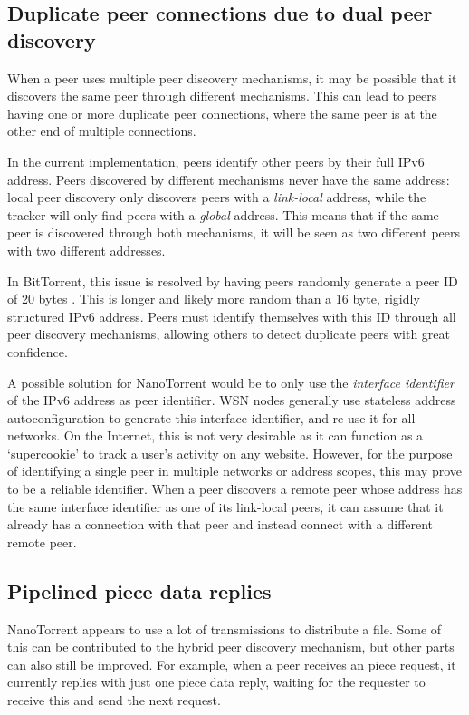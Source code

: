 \subsection{Duplicate peer connections due to dual peer discovery}
When a peer uses multiple peer discovery mechanisms, it may be possible that it discovers the same peer through different mechanisms. This can lead to peers having one or more duplicate peer connections, where the same peer is at the other end of multiple connections.

In the current implementation, peers identify other peers by their full \gls{IPv6} address. Peers discovered by different mechanisms never have the same address: local peer discovery only discovers peers with a \emph{link-local} address, while the tracker will only find peers with a \emph{global} address. This means that if the same peer is discovered through both mechanisms, it will be seen as two different peers with two different addresses.

In BitTorrent, this issue is resolved by having peers randomly generate a peer ID of 20 bytes \cite{bep3}. This is longer and likely more random than a 16 byte, rigidly structured \gls{IPv6} address. Peers must identify themselves with this ID through all peer discovery mechanisms, allowing others to detect duplicate peers with great confidence.

A possible solution for NanoTorrent would be to only use the \emph{interface identifier} of the \gls{IPv6} address as peer identifier. \gls{WSN} nodes generally use stateless address autoconfiguration \cite{rfc4862} to generate this interface identifier, and re-use it for all networks. On the Internet, this is not very desirable as it can function as a `supercookie' to track a user's activity on any website. However, for the purpose of identifying a single peer in multiple networks or address scopes, this may prove to be a reliable identifier. When a peer discovers a remote peer whose address has the same interface identifier as one of its link-local peers, it can assume that it already has a connection with that peer and instead connect with a different remote peer.

\subsection{Pipelined piece data replies}
NanoTorrent appears to use a lot of transmissions to distribute a file. Some of this can be contributed to the hybrid peer discovery mechanism, but other parts can also still be improved. For example, when a peer receives an piece request, it currently replies with just one piece data reply, waiting for the requester to receive this and send the next request.

